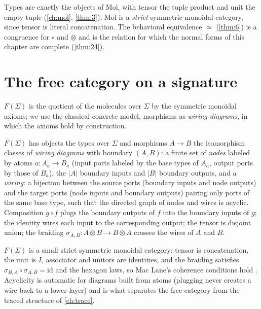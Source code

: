 Types are exactly the objects of Mol, with tensor the tuple product and unit
the empty tuple (\autoref{ch:mol}, \autoref{thm:3}); Mol is a \emph{strict} symmetric
monoidal category, since tensor is literal concatenation. The behavioral
equivalence $\simeq$ (\autoref{thm:6}) is a congruence for $\circ$ and $\otimes$ and is
the relation for which the normal forms of this chapter are complete (\autoref{thm:24}).

\section{The free category on a signature}\label{sec:free-construction}

$F (\Sigma)$ is the quotient of the molecules over $\Sigma$ by the symmetric
monoidal axioms; we use the classical concrete model, morphisms as
\emph{wiring diagrams}, in which the axioms hold by construction.

\begin{definition}\label{def:fsigma}
$F (\Sigma)$ has objects the types over $\Sigma$ and morphisms $A \to B$ the
isomorphism classes of \emph{wiring diagrams} with boundary $(A,B)$: a finite
set of \emph{nodes} labeled by atoms $a \colon A_a \to B_a$ (input ports
labeled by the base types of $A_a$, output ports by those of $B_a$), the
$|A|$ boundary inputs and $|B|$ boundary outputs, and a \emph{wiring}: a
bijection between the source ports (boundary inputs and node outputs) and the
target ports (node inputs and boundary outputs) pairing only ports of the
same base type, such that the directed graph of nodes and wires is acyclic.
Composition $g \circ f$ plugs the boundary outputs of $f$ into the boundary
inputs of $g$; the identity wires each input to the corresponding output; the
tensor is disjoint union; the braiding $\sigma_{A,B} \colon A \otimes B \to
B \otimes A$ crosses the wires of $A$ and $B$.
\end{definition}

\begin{remark}
$F (\Sigma)$ is a small strict symmetric monoidal category: tensor is
concatenation, the unit is $I$, associator and unitors are identities, and
the braiding satisfies $\sigma_{B,A}\circ\sigma_{A,B} = \mathrm{id}$ and the
hexagon laws, so Mac Lane's coherence conditions hold \cite{maclane}.
Acyclicity is automatic for diagrams built from atoms (plugging never creates
a wire back to a lower layer) and is what separates the free category from
the traced structure of \autoref{ch:trace}.
\end{remark}

